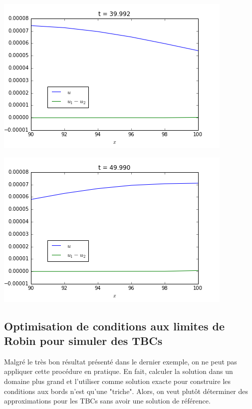 \begingroup
\noindent
	\begin{minipage}{.45\linewidth}
		\includegraphics[scale=.5]{figures/motivational2A.png}	
	\end{minipage}
	\hfill
	\begin{minipage}{.45\linewidth}
		\includegraphics[scale=.5]{figures/motivational2B.png}	
	\end{minipage}
\endgroup

\subsection{Optimisation de conditions aux limites de Robin pour simuler des TBCs}

\indent Malgré le très bon résultat présenté dans le dernier exemple, on ne peut pas appliquer cette procédure en pratique. En fait, calculer la solution dans un domaine plus grand et l'utiliser comme solution exacte pour construire les conditions aux bords n'est qu'une "triche". Alors, on veut plutôt déterminer des approximations pour les TBCs sans avoir une solution de référence.

